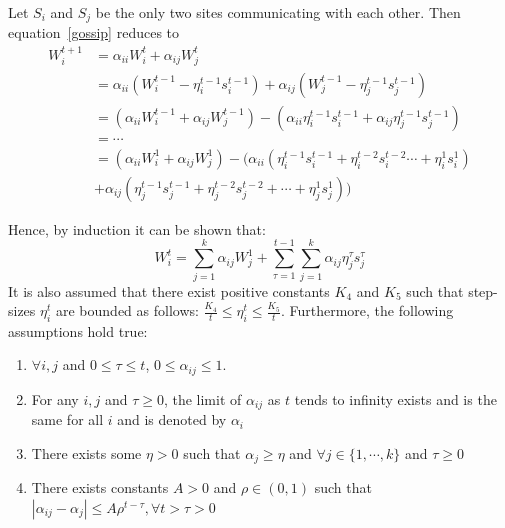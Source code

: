 \begin{ex}
Let $S_i$ and $S_j$ be the only two sites communicating with each other. Then equation~\ref{gossip} reduces to 
\begin{align*}
W_{i}^{t+1} &= \alpha_{ii} W_{i}^{t} + \alpha_{ij} W_{j}^{t} \\
            &= \alpha_{ii} (W_{i}^{t-1} - \eta_i^{t-1} s_i^{t-1}) + \alpha_{ij} (W_{j}^{t-1} - \eta_j^{t-1} s_j^{t-1}) \\
            &= (\alpha_{ii} W_{i}^{t-1} + \alpha_{ij}W_{j}^{t-1}) - ( \alpha_{ii} \eta_i^{t-1} s_i^{t-1} + \alpha_{ij}\eta_j^{t-1} s_j^{t-1}) \\
            &= \cdots \\            
            &= (\alpha_{ii} W_{i}^{1} + \alpha_{ij}W_{j}^{1}) - (\alpha_{ii} (\eta_i^{t-1} s_i^{t-1}+\eta_i^{t-2} s_i^{t-2} \cdots +\eta_i^{1} s_i^{1} ) \\
             &+ \alpha_{ij} (\eta_j^{t-1} s_j^{t-1} + \eta_j^{t-2} s_j^{t-2} + \cdots + \eta_j^{1} s_j^{1}) )    
\end{align*} 
\end{ex}

Hence, by induction it can be shown that:
\begin{equation}
\label{gos1}
W_{i}^{t} = \sum_{j=1}^{k} \alpha_{ij}W_{j}^{1} + \sum_{\tau=1}^{t-1}\sum_{j=1}^{k} \alpha_{ij}\eta_j^{\tau} s_j^{\tau}
\end{equation}
It is also assumed that there exist positive constants $K_4$ and $K_5$ such that step-sizes $\eta_i^{t}$ are bounded as follows:
$\frac{K_4}{t} \le \eta_i^{t} \le \frac{K_5}{t}$. Furthermore, the following assumptions hold true:

\begin{asm}
\begin{enumerate}
\item $\forall i, j$ and $0 \le \tau \le t$, $0 \le \alpha_{ij} \le 1$.
\item For any $i, j$ and $\tau \ge 0$, the limit of $\alpha_{ij}$ as $t$ tends to infinity exists and is the same for all $i$ and is denoted by $\alpha_{i}$
\item There exists some $\eta > 0$ such that $\alpha_{j} \ge \eta $ and $\forall j \in \{1, \cdots, k\}$ and $\tau \ge 0$
\item There exists constants $A > 0$ and $\rho \in (0,1) $ such that $|\alpha_{ij} - \alpha_{j}| \le A \rho^{t-\tau}, \forall t> \tau >0$
\end{enumerate}
\end{asm}

